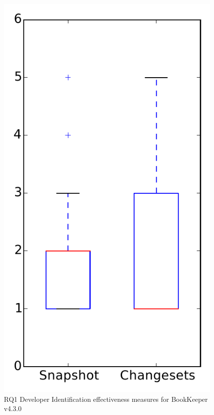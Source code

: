 
\begin{figure}
\centering
\includegraphics[height=0.4\textheight]{figures/dit/rq1_bookkeeper}
\caption{RQ1 Developer Identification effectiveness measures for BookKeeper v4.3.0}
\label{fig:dit:rq1:bookkeeper}
\end{figure}
